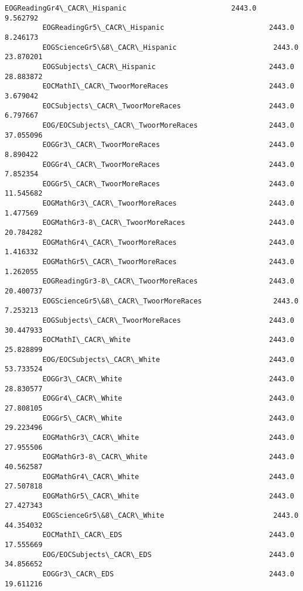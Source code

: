 \documentclass[11pt]{article}
\begin{document}
\begin{Verbatim}[commandchars=\\\{\}]
         EOGReadingGr4\_CACR\_Hispanic                         2443.0       9.562792   
         EOGReadingGr5\_CACR\_Hispanic                         2443.0       8.246173   
         EOGScienceGr5\&8\_CACR\_Hispanic                       2443.0      23.870201   
         EOGSubjects\_CACR\_Hispanic                           2443.0      28.883872   
         EOCMathI\_CACR\_TwoorMoreRaces                        2443.0       3.679042   
         EOCSubjects\_CACR\_TwoorMoreRaces                     2443.0       6.797667   
         EOG/EOCSubjects\_CACR\_TwoorMoreRaces                 2443.0      37.055096   
         EOGGr3\_CACR\_TwoorMoreRaces                          2443.0       8.890422   
         EOGGr4\_CACR\_TwoorMoreRaces                          2443.0       7.852354   
         EOGGr5\_CACR\_TwoorMoreRaces                          2443.0      11.545682   
         EOGMathGr3\_CACR\_TwoorMoreRaces                      2443.0       1.477569   
         EOGMathGr3-8\_CACR\_TwoorMoreRaces                    2443.0      20.784282   
         EOGMathGr4\_CACR\_TwoorMoreRaces                      2443.0       1.416332   
         EOGMathGr5\_CACR\_TwoorMoreRaces                      2443.0       1.262055   
         EOGReadingGr3-8\_CACR\_TwoorMoreRaces                 2443.0      20.400737   
         EOGScienceGr5\&8\_CACR\_TwoorMoreRaces                 2443.0       7.253213   
         EOGSubjects\_CACR\_TwoorMoreRaces                     2443.0      30.447933   
         EOCMathI\_CACR\_White                                 2443.0      25.828899   
         EOG/EOCSubjects\_CACR\_White                          2443.0      53.733524   
         EOGGr3\_CACR\_White                                   2443.0      28.830577   
         EOGGr4\_CACR\_White                                   2443.0      27.808105   
         EOGGr5\_CACR\_White                                   2443.0      29.223496   
         EOGMathGr3\_CACR\_White                               2443.0      27.955506   
         EOGMathGr3-8\_CACR\_White                             2443.0      40.562587   
         EOGMathGr4\_CACR\_White                               2443.0      27.507818   
         EOGMathGr5\_CACR\_White                               2443.0      27.427343   
         EOGScienceGr5\&8\_CACR\_White                          2443.0      44.354032   
         EOCMathI\_CACR\_EDS                                   2443.0      17.555669   
         EOG/EOCSubjects\_CACR\_EDS                            2443.0      34.856652   
         EOGGr3\_CACR\_EDS                                     2443.0      19.611216   

\end{Verbatim}
\end{document}
